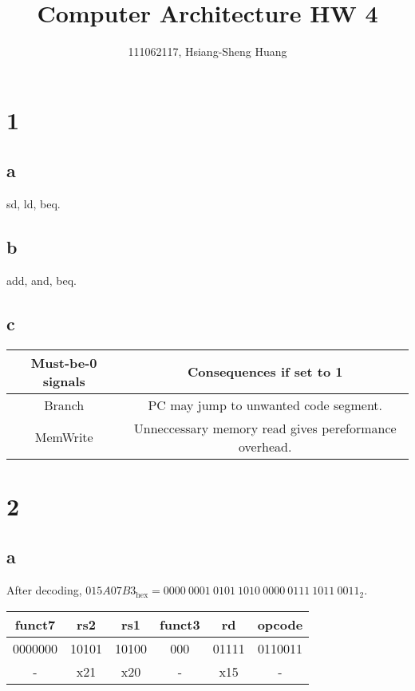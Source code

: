 \documentclass[12pt]{article}
\title{Computer Architecture HW 4}
\author{111062117, Hsiang-Sheng Huang}
\begin{document}
\maketitle

\section*{1}

\subsection*{a}

sd, ld, beq.

\subsection*{b}

add, and, beq.

\subsection*{c}

\begin{table}[h!]
    \centering
    \begin{tabular}{|c|c|}
    \hline
    \textbf{Must-be-0 signals} & \textbf{Consequences if set to 1}  \\
    \hline
    Branch & PC may jump to unwanted code segment. \\
    \hline
    MemWrite & Unneccessary memory read gives pereformance overhead. \\
    \hline
    \end{tabular}
\end{table}

\section*{2}

\subsection*{a}

After decoding, $015A07B3_\text{hex}=0000\ 0001\ 0101\ 1010\ 0000\ 0111\ 1011\ 0011_{2}$.

\begin{table}[h!]
    \centering
    \begin{tabular}{|c|c|c|c|c|c|}
    \hline
    \textbf{funct7} & \textbf{rs2} & \textbf{rs1} & \textbf{funct3} & \textbf{rd} & \textbf{opcode} \\
    \hline
    0000000 & 10101 & 10100 & 000 & 01111 & 0110011 \\
    \hline
    -       & x21   & x20   & -   & x15   & -       \\
    \hline
    \end{tabular}
\end{table}
\end{document}

